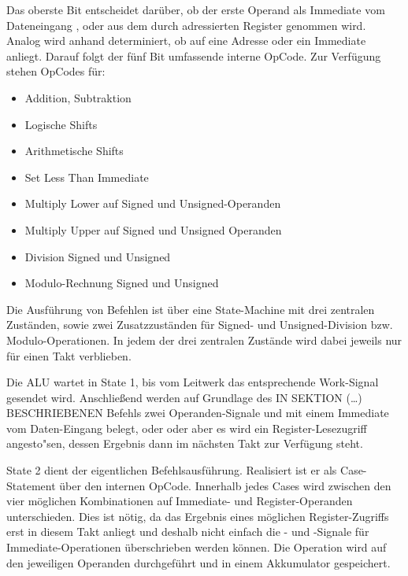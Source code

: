 Das oberste Bit  entscheidet dar\"uber, ob der erste Operand als Immediate vom Dateneingang , oder aus dem durch  adressierten Register genommen wird.
Analog wird anhand  determiniert, ob auf  eine Adresse oder ein Immediate anliegt.
Darauf folgt der f\"unf Bit umfassende interne OpCode. Zur Verf\"ugung stehen OpCodes f\"ur:

\begin{itemize}
\item Addition, Subtraktion
\item Logische Shifts
\item Arithmetische Shifts
\item Set Less Than Immediate
\item Multiply Lower auf Signed und Unsigned-Operanden
\item Multiply Upper auf Signed und Unsigned Operanden
\item Division Signed und Unsigned
\item Modulo-Rechnung Signed und Unsigned
\end{itemize}




Die Ausf\"uhrung von Befehlen ist \"uber eine State-Machine mit drei zentralen Zust\"anden, sowie zwei Zusatzzust\"anden f\"ur Signed- und Unsigned-Division bzw. Modulo-Operationen. In jedem der drei zentralen Zust\"ande wird dabei jeweils nur f\"ur einen Takt verblieben.


Die ALU wartet in State 1, bis vom Leitwerk das entsprechende Work-Signal gesendet wird.
Anschlie\ss{}end werden auf Grundlage des IN SEKTION (…) BESCHRIEBENEN Befehls zwei Operanden-Signale  und  mit einem Immediate vom Daten-Eingang belegt, oder oder aber es wird ein Register-Lesezugriff angesto"sen, dessen Ergebnis dann im nächsten Takt zur Verf\"ugung steht.


State 2 dient der eigentlichen Befehlsausf\"uhrung. Realisiert ist er als Case-Statement \"uber den internen OpCode. Innerhalb jedes Cases wird zwischen den vier m\"oglichen Kombinationen auf Immediate- und Register-Operanden unterschieden.
Dies ist n\"otig, da das Ergebnis eines m\"oglichen Register-Zugriffs erst in diesem Takt anliegt und deshalb nicht einfach die - und -Signale f\"ur Immediate-Operationen \"uberschrieben werden k\"onnen.
Die Operation wird auf den jeweiligen Operanden durchgef\"uhrt und in einem Akkumulator gespeichert.\vspace{10pt}


